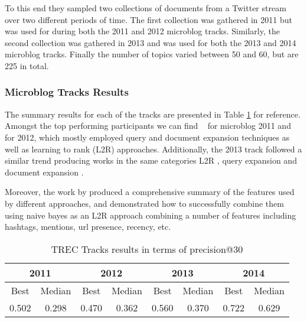 To this end they sampled two collections of documents from a Twitter stream over two different periods of time. The first collection was gathered in 2011 but was used for during both the 2011 and 2012 microblog tracks. Similarly, the second collection was gathered in 2013 and was used for both the 2013 and 2014 microblog tracks. Finally the number of topics varied between 50 and 60, but are 225 in total.


\subsubsection{Microblog Tracks Results}
The summary results for each of the tracks are presented in Table \ref{summarytrec} for reference. Amongst the top performing participants we can find ~\cite{amati2011fub,li2011pris,metzler2011usc} for microblog 2011 and ~\cite{kimovercoming,younosFreq,hanhit} for 2012, which mostly employed query and document expansion techniques as well as learning to rank (L2R) approaches.
Additionally, the 2013 track followed a similar trend producing works in the same categories L2R \cite{pris2013,gaoictnet}, query expansion \cite{prebjut,perezuniversity} and document expansion \cite{jabeuririt}.

Moreover, the work by \cite{Damak:2013:ESF:2480362.2480537} produced a comprehensive summary of the features used by different approaches, and demonstrated how to successfully combine them using naive bayes as an L2R approach combining a number of features including hashtags, mentions, url presence, recency, etc.


\begin{table}[]
	\centering
	
	\caption{TREC Tracks results in terms of precision@30}
	
	\begin{tabular}{|c|c|c|c|c|c|c|c|}
		\hline
		\multicolumn{2}{|c|}{2011} &\multicolumn{2}{|c|}{2012} & \multicolumn{2}{|c|}{2013} & \multicolumn{2}{|c|}{2014} \\
		\hline
		Best & Median & Best & Median &	Best & Median &	Best & Median \\
		0.502 & 0.298 & 0.470 & 0.362 & 0.560 & 0.370 & 0.722 & 0.629 \\
		\hline
		
	\end{tabular}
	
	\label{summarytrec}
	\vspace{0.5cm}
\end{table}

